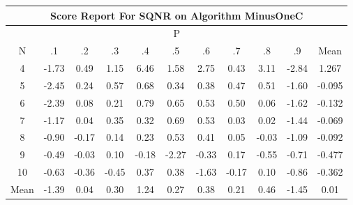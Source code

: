 \documentclass[11pt,a4paper]{report}
\begin{document}
\begin{longtable}{ | c || c | c | c | c | c | c | c | c | c || c |}
\hline
\multicolumn{11}{|c|}{ Score Report For SQNR on Algorithm MinusOneC} \\
\hline
\multicolumn{11}{|c|}{ P } \\
\hline
N & .1 & .2 & .3 & .4 & .5 & .6 & .7 & .8 & .9 & Mean\\
 \hline
 \hline
 \endhead
  4 &  \cellcolor[HTML]{FFD7D7} -1.73 &  \cellcolor[HTML]{EFEFFF} 0.49 &  \cellcolor[HTML]{DFDFFF} 1.15 &  \cellcolor[HTML]{6060FF} 6.46 &  \cellcolor[HTML]{D7D7FF} 1.58 &  \cellcolor[HTML]{B7B7FF} 2.75 &  \cellcolor[HTML]{F7F7FF} 0.43 &  \cellcolor[HTML]{AFAFFF} 3.11 &  \cellcolor[HTML]{FFB7B7} -2.84 & 1.267 \\
  5 &  \cellcolor[HTML]{FFBFBF} -2.45 &  \cellcolor[HTML]{F7F7FF} 0.24 &  \cellcolor[HTML]{EFEFFF} 0.57 &  \cellcolor[HTML]{EFEFFF} 0.68 &  \cellcolor[HTML]{F7F7FF} 0.34 &  \cellcolor[HTML]{F7F7FF} 0.38 &  \cellcolor[HTML]{F7F7FF} 0.47 &  \cellcolor[HTML]{EFEFFF} 0.51 &  \cellcolor[HTML]{FFD7D7} -1.60 & -0.095 \\
  6 &  \cellcolor[HTML]{FFBFBF} -2.39 &  \cellcolor[HTML]{FFFFFF} 0.08 &  \cellcolor[HTML]{F7F7FF} 0.21 &  \cellcolor[HTML]{EFEFFF} 0.79 &  \cellcolor[HTML]{EFEFFF} 0.65 &  \cellcolor[HTML]{EFEFFF} 0.53 &  \cellcolor[HTML]{EFEFFF} 0.50 &  \cellcolor[HTML]{FFFFFF} 0.06 &  \cellcolor[HTML]{FFD7D7} -1.62 & -0.132 \\
  7 &  \cellcolor[HTML]{FFDFDF} -1.17 &  \cellcolor[HTML]{FFFFFF} 0.04 &  \cellcolor[HTML]{F7F7FF} 0.35 &  \cellcolor[HTML]{F7F7FF} 0.32 &  \cellcolor[HTML]{EFEFFF} 0.69 &  \cellcolor[HTML]{EFEFFF} 0.53 &  \cellcolor[HTML]{FFFFFF} 0.03 &  \cellcolor[HTML]{FFFFFF} 0.02 &  \cellcolor[HTML]{FFD7D7} -1.44 & -0.069 \\
  8 &  \cellcolor[HTML]{FFE7E7} -0.90 &  \cellcolor[HTML]{FFF7F7} -0.17 &  \cellcolor[HTML]{FFFFFF} 0.14 &  \cellcolor[HTML]{F7F7FF} 0.23 &  \cellcolor[HTML]{EFEFFF} 0.53 &  \cellcolor[HTML]{F7F7FF} 0.41 &  \cellcolor[HTML]{FFFFFF} 0.05 &  \cellcolor[HTML]{FFFFFF} -0.03 &  \cellcolor[HTML]{FFE7E7} -1.09 & -0.092 \\
  9 &  \cellcolor[HTML]{FFEFEF} -0.49 &  \cellcolor[HTML]{FFFFFF} -0.03 &  \cellcolor[HTML]{FFFFFF} 0.10 &  \cellcolor[HTML]{FFF7F7} -0.18 &  \cellcolor[HTML]{FFC7C7} -2.27 &  \cellcolor[HTML]{FFF7F7} -0.33 &  \cellcolor[HTML]{F7F7FF} 0.17 &  \cellcolor[HTML]{FFEFEF} -0.55 &  \cellcolor[HTML]{FFEFEF} -0.71 & -0.477 \\
  10 &  \cellcolor[HTML]{FFEFEF} -0.63 &  \cellcolor[HTML]{FFF7F7} -0.36 &  \cellcolor[HTML]{FFF7F7} -0.45 &  \cellcolor[HTML]{F7F7FF} 0.37 &  \cellcolor[HTML]{F7F7FF} 0.38 &  \cellcolor[HTML]{FFD7D7} -1.63 &  \cellcolor[HTML]{FFF7F7} -0.17 &  \cellcolor[HTML]{FFFFFF} 0.10 &  \cellcolor[HTML]{FFE7E7} -0.86 & -0.362 \\
 \hline
 \hline
Mean &  \cellcolor[HTML]{FFDFDF} -1.39 &  \cellcolor[HTML]{FFFFFF} 0.04 &  \cellcolor[HTML]{F7F7FF} 0.30 &  \cellcolor[HTML]{DFDFFF} 1.24 &  \cellcolor[HTML]{F7F7FF} 0.27 &  \cellcolor[HTML]{F7F7FF} 0.38 &  \cellcolor[HTML]{F7F7FF} 0.21 &  \cellcolor[HTML]{F7F7FF} 0.46 &  \cellcolor[HTML]{FFD7D7} -1.45 &  \cellcolor[HTML]{FFFFFF} 0.01
\end{longtable}
\end{document}

